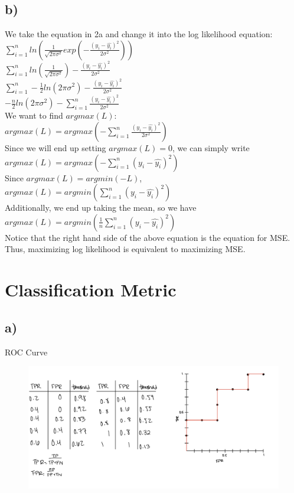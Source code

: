 \documentclass[12pt, letterpaper]{article}
\begin{document}
\subsection*{b)} We take the equation in 2a and change it into the log likelihood equation:\\
$\sum_{i=1}^{n}ln(\frac{1}{\sqrt{2\pi\sigma^2}}exp(-\frac{(y_i - \hat{y_i})^2}{2\sigma^2}))$\\
$\sum_{i=1}^{n}ln(\frac{1}{\sqrt{2\pi\sigma^2}}) -\frac{(y_i - \hat{y_i})^2}{2\sigma^2}$\\
$\sum_{i=1}^{n}-\frac{1}{2}ln(2\pi\sigma^2) -\frac{(y_i - \hat{y_i})^2}{2\sigma^2}$\\
$-\frac{n}{2}ln(2\pi\sigma^2) -\sum_{i=1}^{n}\frac{(y_i - \hat{y_i})^2}{2\sigma^2}$\\

We want to find $argmax(L)$:\\
$argmax(L) = argmax(-\sum_{i=1}^{n}\frac{(y_i - \hat{y_i})^2}{2\sigma^2})$\\
Since we will end up setting $argmax(L) = 0$, we can simply write\\
$argmax(L) = argmax(-\sum_{i=1}^{n}(y_i - \hat{y_i})^2)$\\
Since $argmax(L) = argmin(-L)$, \\
$argmax(L) = argmin(\sum_{i=1}^{n}(y_i - \hat{y_i})^2)$\\
Additionally, we end up taking the mean, so we have\\
$argmax(L) = argmin(\frac{1}{n}\sum_{i=1}^{n}(y_i - \hat{y_i})^2)$\\
Notice that the right hand side of the above equation is the equation for MSE. Thus, maximizing log likelihood is equivalent to maximizing MSE.

\newpage
\section{Classification Metric}
\subsection*{a)}ROC Curve
\FloatBarrier
\begin{figure}[h!]
  \includegraphics[scale=0.33]{./images/3a.jpg}
\end{figure}
\clearpage
\end{document}
